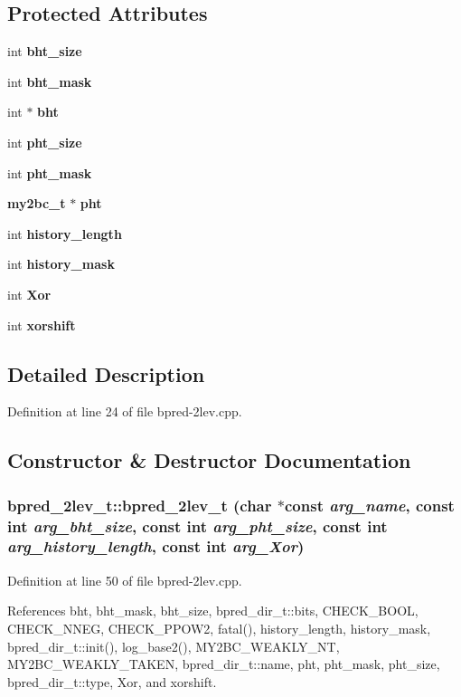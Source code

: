 \subsection*{Protected Attributes}
\begin{CompactItemize}
\item 
int {\bf bht\_\-size}
\item 
int {\bf bht\_\-mask}
\item 
int $\ast$ {\bf bht}
\item 
int {\bf pht\_\-size}
\item 
int {\bf pht\_\-mask}
\item 
{\bf my2bc\_\-t} $\ast$ {\bf pht}
\item 
int {\bf history\_\-length}
\item 
int {\bf history\_\-mask}
\item 
int {\bf Xor}
\item 
int {\bf xorshift}
\end{CompactItemize}


\subsection{Detailed Description}


Definition at line 24 of file bpred-2lev.cpp.

\subsection{Constructor \& Destructor Documentation}
\subsubsection[{bpred\_\-2lev\_\-t}]{\setlength{\rightskip}{0pt plus 5cm}bpred\_\-2lev\_\-t::bpred\_\-2lev\_\-t (char $\ast$const  {\em arg\_\-name}, \/  const int {\em arg\_\-bht\_\-size}, \/  const int {\em arg\_\-pht\_\-size}, \/  const int {\em arg\_\-history\_\-length}, \/  const int {\em arg\_\-Xor})\hspace{0.3cm}{\tt  [inline]}}\label{classbpred__2lev__t_94342d909f4e32ff1e0430b0f3ca56c3}




Definition at line 50 of file bpred-2lev.cpp.

References bht, bht\_\-mask, bht\_\-size, bpred\_\-dir\_\-t::bits, CHECK\_\-BOOL, CHECK\_\-NNEG, CHECK\_\-PPOW2, fatal(), history\_\-length, history\_\-mask, bpred\_\-dir\_\-t::init(), log\_\-base2(), MY2BC\_\-WEAKLY\_\-NT, MY2BC\_\-WEAKLY\_\-TAKEN, bpred\_\-dir\_\-t::name, pht, pht\_\-mask, pht\_\-size, bpred\_\-dir\_\-t::type, Xor, and xorshift.
